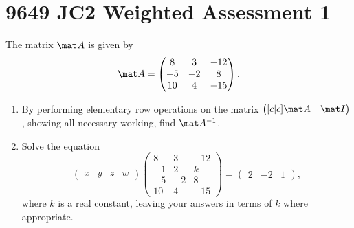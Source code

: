 \section{9649 JC2 Weighted Assessment 1}

\begin{problem}
    The matrix $\mat A$ is given by \[\mat A = \begin{pmatrix}8 & 3 & -12 \\ -5 & -2 & 8 \\ 10 & 4 & -15\end{pmatrix}.\]
    
    \begin{enumerate}
        \item By performing elementary row operations on the matrix $\begin{pmatrix}[c|c] \mat A & \mat I\end{pmatrix}$, showing all necessary working, find $\mat A^{-1}$.
        \item Solve the equation \[\begin{pmatrix}x & y & z & w\end{pmatrix} \begin{pmatrix}8 & 3 & -12 \\ -1 & 2 & k \\ -5 & -2 & 8 \\ 10 & 4 & -15\end{pmatrix} = \begin{pmatrix}2 & -2 & 1\end{pmatrix},\] where $k$ is a real constant, leaving your answers in terms of $k$ where appropriate.
    \end{enumerate}
\end{problem}
